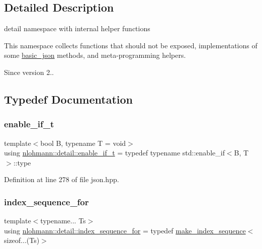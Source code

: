 \subsection{Detailed Description}
detail namespace with internal helper functions 

This namespace collects functions that should not be exposed, implementations of some \hyperlink{classnlohmann_1_1basic__json}{basic\+\_\+json} methods, and meta-\/programming helpers.

\begin{DoxySince}{Since}
version 2.. 
\end{DoxySince}


\subsection{Typedef Documentation}
\mbox{\label{namespacenlohmann_1_1detail_a02bcbc878bee413f25b985ada771aa9c}} 
\subsubsection{\texorpdfstring{enable\+\_\+if\+\_\+t}{enable\_if\_t}}
{\footnotesize\ttfamily template$<$bool B, typename T  = void$>$ \\
using \hyperlink{namespacenlohmann_1_1detail_a02bcbc878bee413f25b985ada771aa9c}{nlohmann\+::detail\+::enable\+\_\+if\+\_\+t} = typedef typename std\+::enable\+\_\+if$<$B, T$>$\+::type}



Definition at line 278 of file json.\+hpp.

\mbox{\label{namespacenlohmann_1_1detail_a24800493c6ec02ce033dcbb47b7fd28e}} 
\subsubsection{\texorpdfstring{index\+\_\+sequence\+\_\+for}{index\_sequence\_for}}
{\footnotesize\ttfamily template$<$typename... Ts$>$ \\
using \hyperlink{namespacenlohmann_1_1detail_a24800493c6ec02ce033dcbb47b7fd28e}{nlohmann\+::detail\+::index\+\_\+sequence\+\_\+for} = typedef \hyperlink{structnlohmann_1_1detail_1_1make__index__sequence}{make\+\_\+index\+\_\+sequence}$<$sizeof...(Ts)$>$}



